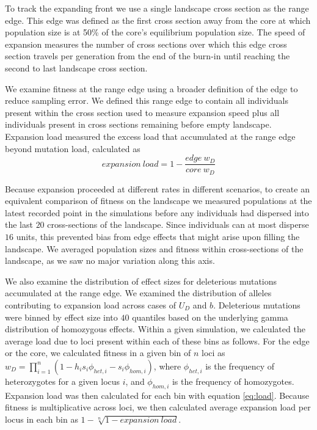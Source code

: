 To track the expanding front we use a single landscape cross section as the range edge. This edge was defined as the first cross section away from the core at which population size is at 50\% of the core's equilibrium population size. The speed of expansion measures the number of cross sections over which this edge cross section travels per generation from the end of the burn-in until reaching the second to last landscape cross section.

We examine fitness at the range edge using a broader definition of the edge to reduce sampling error. We defined this range edge to contain all individuals present within the cross section used to measure expansion speed plus all individuals present in cross sections remaining before empty landscape. Expansion load measured the excess load that accumulated at the range edge beyond mutation load, calculated as 
\begin{equation}
\label{eq:load}
expansion~load = 1 - \frac{edge ~ w_D}{core ~ w_D}
\end{equation}

Because expansion proceeded at different rates in different scenarios, to create an equivalent comparison of fitness on the landscape we measured populations at the latest recorded point in the simulations before any individuals had dispersed into the last $20$ cross-sections of the landscape. Since individuals can at most disperse $16$ units, this prevented bias from edge effects that might arise upon filling the landscape. We averaged population sizes and fitness within cross-sections of the landscape, as we saw no major variation along this axis.

We also examine the distribution of effect sizes for deleterious mutations accumulated at the range edge. We examined the distribution of alleles contributing to expansion load across cases of $U_D$ and $b$. Deleterious mutations were binned by effect size into $40$ quantiles based on the underlying gamma distribution of homozygous effects. Within a given simulation, we calculated the average load due to loci present within each of these bins as follows. For the edge or the core, we calculated fitness in a given bin  of $n$ loci as $w_D =  \prod_{i=1}^{n} (1 - h_i s_i \phi_{het,i} - s_i \phi_{hom,i})$, where $\phi_{het,i}$ is the frequency of heterozygotes for a given locus $i$, and $\phi_{hom,i}$ is the frequency of homozygotes. Expansion load was then calculated for each bin with equation \ref{eq:load}. Because fitness is multiplicative across loci, we then calculated average expansion load per locus in each bin as $1 - \sqrt[n]{1 - expansion~load}$.


